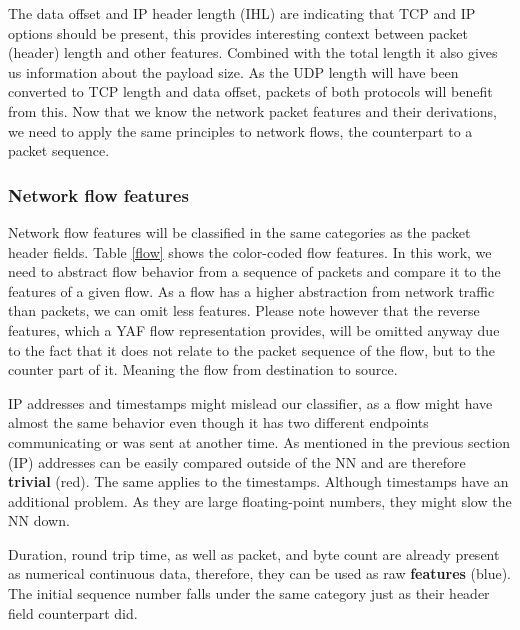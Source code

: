 \documentclass[
	ngerman,
	ruledheaders=section,%
	class=report,%
	thesis={type=bachelor},%
	accentcolor=9c,%
	custommargins=true,%
	marginpar=false,%
	parskip=half-,%
	fontsize=11pt,%
	twoside
]{tudapub}
\begin{document}
The data offset and IP header length (IHL) are indicating that TCP and IP options should be present, this provides interesting context between packet (header) length and other features.
Combined with the total length it also gives us information about the payload size.
As the UDP length will have been converted to TCP length and data offset, packets of both protocols will benefit from this.
Now that we know the network packet features and their derivations, we need to apply the same principles to network flows, the counterpart to a packet sequence.

\subsubsection{Network flow features}
\label{sec:flowFeatures}

Network flow features will be classified in the same categories as the packet header fields.
Table \ref{flow} shows the color-coded flow features.
In this work, we need to abstract flow behavior from a sequence of packets and compare it to the features of a given flow.
As a flow has a higher abstraction from network traffic than packets, we can omit less features.
Please note however that the reverse features, which a YAF flow representation provides, will be omitted anyway due to the fact that it does not relate to the packet sequence of the flow, but to the counter part of it.
Meaning the flow from destination to source.

IP addresses and timestamps might mislead our classifier, as a flow might have almost the same behavior even though it has two different endpoints communicating or was sent at another time.
As mentioned in the previous section (IP) addresses can be easily compared outside of the NN and are therefore \colorbox{trivial}{\textbf{trivial} (red)}.
The same applies to the timestamps.
Although timestamps have an additional problem. As they are large floating-point numbers, they might slow the NN down.

Duration, round trip time, as well as packet, and byte count are already present as numerical continuous data, therefore, they can be used as raw \colorbox{feature}{\textbf{features} (blue)}. The initial sequence number falls under the same category just as their header field counterpart did.
\end{document}
